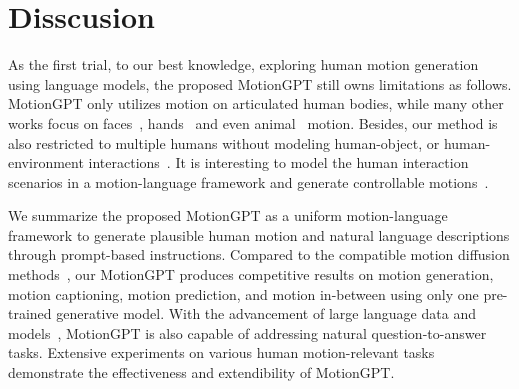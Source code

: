 \section{Disscusion}
As the first trial, to our best knowledge, exploring human motion generation using language models, the proposed MotionGPT still owns limitations as follows.
%
MotionGPT only utilizes motion on articulated human bodies, while many other works focus on faces~\cite{karras2017audio, cao2018sparse}, hands~\cite{romero2022embodied, li2022nimble, li2021piano} and even animal~\cite{Rueeg:CVPR:2022, Zuffi:CVPR:2018} motion.
%
Besides, our method is also restricted to multiple humans without modeling human-object, or human-environment interactions~\cite{shafir2023priormdm}.
%
It is interesting to model the human interaction scenarios in a motion-language framework and generate controllable motions~\cite{shafir2023priormdm}.


We summarize the proposed MotionGPT as a uniform motion-language framework to generate plausible human motion and natural language descriptions through prompt-based instructions. Compared to the compatible motion diffusion methods~\cite{chen2023mld, mdm2022human}, our MotionGPT produces competitive results on motion generation, motion captioning, motion prediction, and motion in-between using only one pre-trained generative model. With the advancement of large language data and models~\cite{raffel2020t5,chung2022flant5}, MotionGPT is also capable of addressing natural question-to-answer tasks.
%
Extensive experiments on various human motion-relevant tasks demonstrate the effectiveness and extendibility of MotionGPT.


